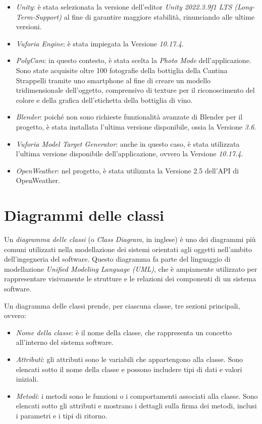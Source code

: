 \begin{itemize}
  \item \textit{Unity}: è stata selezionata la versione dell'editor \textit{Unity 2022.3.9f1 LTS (Long-Term-Support)} al fine di garantire maggiore stabilità, rinunciando alle ultime versioni.
  \item \textit{Vuforia Engine}: è stata impiegata la Versione \textit{10.17.4}.
  \item \textit{PolyCam}: in questo contesto, è stata scelta la \textit{Photo Mode} dell'applicazione. Sono state acquisite oltre 100 fotografie della bottiglia della Cantina Strappelli tramite uno smartphone al fine di creare un modello tridimensionale dell'oggetto, comprensivo di texture per il riconoscimento del colore e della grafica dell'etichetta della bottiglia di vino.
  \item \textit{Blender}: poiché non sono richieste funzionalità avanzate di Blender per il progetto, è stata installata l'ultima versione disponibile, ossia la Versione \textit{3.6}.
  \item \textit{Vuforia Model Target Generator}: anche in questo caso, è stata utilizzata l'ultima versione disponibile dell'applicazione, ovvero la Versione \textit{10.17.4}.
  \item \textit{OpenWeather}: nel progetto, è stata utilizzata la Versione 2.5 dell'API di OpenWeather.
\end{itemize}


\section{Diagrammi delle classi}

Un \textit{diagramma delle classi} (o \textit{Class Diagram}, in inglese) è uno dei diagrammi più comuni utilizzati nella modellazione dei sistemi orientati agli oggetti nell'ambito dell'ingegneria del software. Questo diagramma fa parte del linguaggio di modellazione \textit{Unified Modeling Language (UML)}, che è ampiamente utilizzato per rappresentare visivamente le strutture e le relazioni dei componenti di un sistema software.

Un diagramma delle classi prende, per ciascuna classe, tre sezioni principali, ovvero:

\begin{itemize}
    \item \textit{Nome della classe}: è il nome della classe, che rappresenta un concetto all'interno del sistema software.
    \item \textit{Attributi}: gli attributi sono le variabili che appartengono alla classe. Sono elencati sotto il nome della classe e possono includere tipi di dati e valori iniziali.
    \item \textit{Metodi}: i metodi sono le funzioni o i comportamenti associati alla classe. Sono elencati sotto gli attributi e mostrano i dettagli sulla firma dei metodi, inclusi i parametri e i tipi di ritorno.
\end{itemize}

